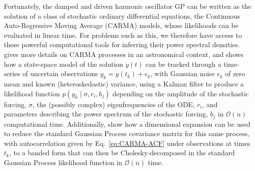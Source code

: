 \documentclass[modern]{aastex61}
\begin{document}
Fortunately, the damped and driven harmonic oscillator GP can be written as the solution of a class of stochastic ordinary differential equations, the Continuous Auto-Regressive Moving Average
(CARMA) models, whose likelihoods can be evaluated in linear time. For problems
such as this, we therefore have access to these
powerful computational tools for inferring their power spectral densities.
\citet{Kelly2014} gives more details on CARMA processes in an astronomical
context, and shows how a state-space model of the solution $y(t)$ can be tracked
through a time-series of uncertain observations $y_k = y\left( t_k \right) +
\epsilon_k$, with Gaussian noise $\epsilon_k$ of zero mean and known
(heteroskedastic) variance, using a Kalman filter to produce a likelihood
function $p\left( y_k \mid \sigma, r_i, b_j \right)$ depending on the amplitude
of the stochastic forcing, $\sigma$, the (possibly complex) eigenfrequencies of
the ODE, $r_i$, and parameters describing the power spectrum of the stochastic
forcing, $b_j$ in $\mathcal{O}\left( n \right)$ computational time.
Additionally, \citet{Foreman-Mackey2017} show how a dimensional expansion can be
used to reduce the standard Gaussian Process covariance matrix for this same
process,  with autocorrelation given by Eq.\ \eqref{eq:CARMA-ACF} under
observations at times $t_k$, to a banded form that can then be
Cholesky-decomposed in the standard Gaussian Process likelihood function in
$\mathcal{O}\left( n \right)$ time.
\end{document}
